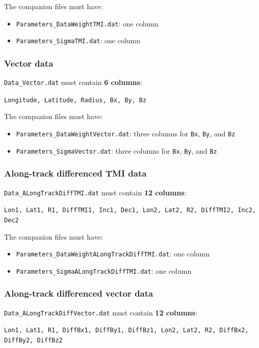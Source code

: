 \documentclass[11pt,a4paper]{article}
\begin{document}
The companion files must have:
\begin{itemize}
  \item \texttt{Parameters\_DataWeightTMI.dat}: one column
  \item \texttt{Parameters\_SigmaTMI.dat}: one column
\end{itemize}

\subsubsection{Vector data}

\texttt{Data\_Vector.dat} must contain \textbf{6 columns}:
\begin{center}
\texttt{Longitude, Latitude, Radius, Bx, By, Bz}
\end{center}

The companion files must have:
\begin{itemize}
  \item \texttt{Parameters\_DataWeightVector.dat}: three columns for \texttt{Bx}, \texttt{By}, and \texttt{Bz}
  \item \texttt{Parameters\_SigmaVector.dat}: three columns for \texttt{Bx}, \texttt{By}, and \texttt{Bz}
\end{itemize}

\subsubsection{Along-track differenced TMI data}

\texttt{Data\_ALongTrackDiffTMI.dat} must contain \textbf{12 columns}:
\begin{center}
\texttt{Lon1, Lat1, R1, DiffTMI1, Inc1, Dec1, Lon2, Lat2, R2, DiffTMI2, Inc2, Dec2}
\end{center}

The companion files must have:
\begin{itemize}
  \item \texttt{Parameters\_DataWeightALongTrackDiffTMI.dat}: one column
  \item \texttt{Parameters\_SigmaALongTrackDiffTMI.dat}: one column
\end{itemize}

\subsubsection{Along-track differenced vector data}

\texttt{Data\_ALongTrackDiffVector.dat} must contain \textbf{12 columns}:
\begin{center}
\texttt{Lon1, Lat1, R1, DiffBx1, DiffBy1, DiffBz1, Lon2, Lat2, R2, DiffBx2, DiffBy2, DiffBz2}
\end{center}
\end{document}
